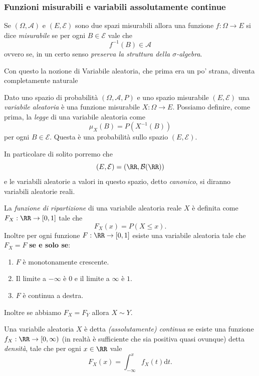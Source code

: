 \documentclass[11pt]{scrartcl}
\newcommand{\dif}{\text{d}}
\begin{document}
	\subsubsection{Funzioni misurabili e variabili assolutamente continue}
	\begin{definition}
		Se $(\Omega,\mathcal{A})$ e $(E,\mathcal{E})$ sono due spazi misurabili allora una funzione $f:\Omega\to E $ si dice \textit{misurabile} se per ogni $B\in \mathcal{E}$ vale che
		$$f^{-1}(B)\in \mathcal{A}$$
		ovvero se, in un certo senso \textit{preserva la struttura della $\sigma$-algebra}.
	\end{definition}
	Con questo la nozione di Variabile aleatoria, che prima era un po' strana, diventa completamente naturale
	\begin{definition}
		Dato uno spazio di probabilità $(\Omega,\mathcal{A},P)$ e uno spazio misurabile $(E,\mathcal{E})$ una \textit{variabile aleatoria} è una funzione misurabile $X:\Omega\to E$. Possiamo definire, come prima, la \textit{legge} di una variabile aleatoria come
		$$\mu_X(B)=P\left(X^{-1}(B)\right)$$
		per ogni $B\in \mathcal{E}$. Questa è una probabilità sullo spazio $(E,\mathcal{E})$.
	\end{definition}
	In particolare di solito porremo che 
	$$(E,\mathcal{E})=(\RR,\mathcal{B}(\RR))$$
	e le variabili aleatorie a valori in questo spazio, detto \textit{canonico}, si diranno variabili aleatorie reali.
	\begin{definition}
		La \textit{funzione di ripartizione} di una variabile aleatoria reale $X$ è definita come $F_X:\RR\to [0,1]$ tale che
		$$F_X(x)=P(X\le x).$$
		Inoltre per ogni funzione $F:\RR\to[0,1]$ esiste una variabile aleatoria tale che $F_X=F$ \textbf{se e solo se}:
		\begin{enumerate}
			\item $F$ è monotonamente crescente.
			\item Il limite a $-\infty$ è $0$ e il limite a $\infty$ è $1$.
			\item $F$ è continua a destra.
		\end{enumerate}
		Inoltre se abbiamo $F_X=F_Y$ allora $X\sim Y$.
	\end{definition}
	\begin{definition}
		Una variabile aleatoria $X$ è detta \textit{(assolutamente) continua} se esiste una funzione $f_X:\RR\to[0,\infty)$ (in realtà è sufficiente che sia positiva quasi ovunque) detta \textit{densità}, tale che per ogni $x\in \RR$ vale
		$$F_X(x)=\int_{-\infty}^xf_X(t)\dif t.$$
	\end{definition}
\end{document}
